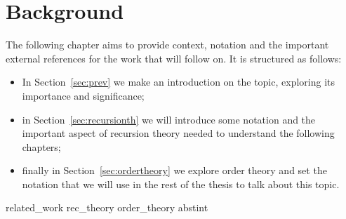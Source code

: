 \chapter{Background}

The following chapter aims to provide context, notation and the
important external references for the work that will follow on. It is
structured as follows:

\begin{itemize}
\item In Section~\ref{sec:prev} we make an introduction on the topic,
  exploring its importance and significance;
\item in Section~\ref{sec:recursionth} we will introduce some notation
  and the important aspect of recursion theory needed to understand the
  following chapters;
\item finally in Section~\ref{sec:ordertheory} we explore order theory
  and set the notation that we will use in the rest of the thesis to
  talk about this topic.
\end{itemize}

{related_work}
{rec_theory}
{order_theory}
{abstint}
